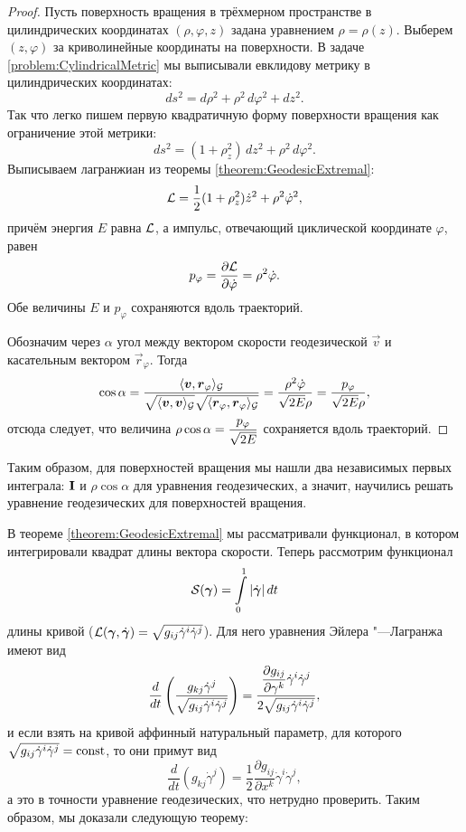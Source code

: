 \begin{proof} %
	Пусть поверхность вращения в трёхмерном пространстве в цилиндрических координатах $(\rho, \varphi, z)$ задана уравнением $\rho = \rho(z)$. Выберем $(z, \varphi)$ за криволинейные координаты на поверхности. В задаче \ref{problem:CylindricalMetric} мы выписывали евклидову метрику в цилиндрических координатах:
	\[
		ds^2 = d\rho^2 + \rho^2\,d\varphi^2 + dz^2.
	\]
	Так что легко пишем первую квадратичную форму поверхности вращения как ограничение этой метрики:
	\[
		ds^2 = (1 + \rho_z^2)\,dz^2 + \rho^2\,d\varphi^2.
	\]
	Выписываем лагранжиан из теоремы \ref{theorem:GeodesicExtremal}:
	\[
		\mathcal{L} = \frac{1}{2}(1 + \rho_z^2)\dot{z}^2 + \rho^2\dot{\varphi}^2,
	\]
	причём энергия $E$ равна $\mathcal{L}$, а импульс, отвечающий циклической координате $\varphi$, равен
	\[
		p_\varphi = \frac{\partial\mathcal{L}}{\partial\dot{\varphi}} = \rho^2\dot{\varphi}.
	\]
	Обе величины $E$ и $p_\varphi$ сохраняются вдоль траекторий.

	Обозначим через $\alpha$ угол между вектором скорости геодезической $\vec{v}$ и касательным вектором $\vec{r}_\varphi$. Тогда
	\[
		\cos\alpha = \frac{\langle\boldsymbol{v}, \boldsymbol{r}_\varphi\rangle_{\mathcal{G}}}{\sqrt{\langle\boldsymbol{v}, \boldsymbol{v}\rangle_{\mathcal{G}}}\sqrt{\langle\boldsymbol{r}_\varphi, \boldsymbol{r}_\varphi\rangle_{\mathcal{G}}}} = \frac{\rho^2\dot{\varphi}}{\sqrt{2E}\rho} = \frac{p_\varphi}{\sqrt{2E}\rho},
	\]
	отсюда следует, что величина $\displaystyle\rho\cos\alpha = \frac{p_\varphi}{\sqrt{2E}}$ сохраняется вдоль траекторий.
\end{proof}

Таким образом, для поверхностей вращения мы нашли два независимых первых интеграла: $\boldsymbol{\operatorname{I}}$ и $\rho\cos\alpha$ для уравнения геодезических, а значит, научились решать уравнение геодезических для поверхностей вращения.

В теореме \ref{theorem:GeodesicExtremal} мы рассматривали функционал, в котором интегрировали квадрат длины вектора скорости. Теперь рассмотрим функционал
\[
	\mathcal{S}(\boldsymbol{\gamma}) = \int\limits_0^1\left\lvert\dot{\boldsymbol{\gamma}}\right\rvert dt
\]
длины кривой ($\mathcal{L}(\boldsymbol{\gamma}, \dot{\boldsymbol{\gamma}}) = \sqrt{g_{ij}\dot{\gamma}^i\dot{\gamma}^j}$). Для него уравнения Эйлера "---Лагранжа имеют вид
\[
	\frac{d}{dt}\left(\frac{g_{kj}\dot{\gamma}^j}{\sqrt{g_{ij}\dot{\gamma}^i\dot{\gamma}^j}}\right) = \frac{\displaystyle\frac{\partial g_{ij}}{\partial\gamma^k}\dot{\gamma}^i\dot{\gamma}^j}{2\sqrt{g_{ij}\dot{\gamma}^i\dot{\gamma}^j}},
\]
и если взять на кривой аффинный натуральный параметр, для которого $\sqrt{g_{ij}\dot{\gamma}^i\dot{\gamma}^j} = \mathrm{const}$, то они примут вид
\[
	\frac{d}{dt}(g_{kj}\dot{\gamma}^j) = \frac{1}{2}\frac{\partial g_{ij}}{\partial x^k}\dot{\gamma}^i\dot{\gamma}^j,
\]
а это в точности уравнение геодезических, что нетрудно проверить. Таким образом, мы доказали следующую теорему:

